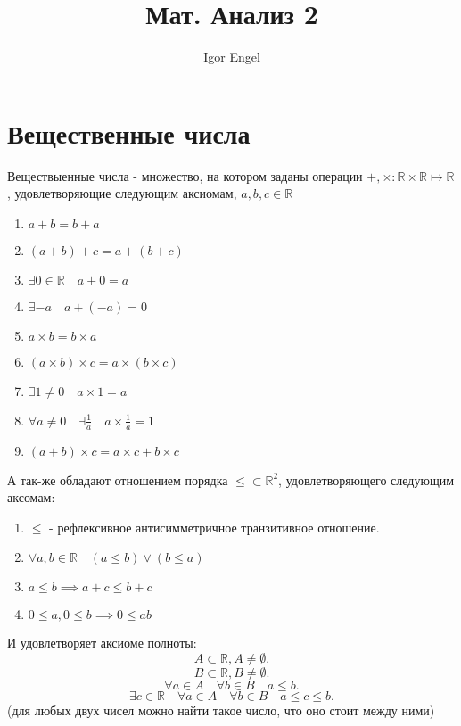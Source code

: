 \documentclass[11pt, oneside]{article}   	%
\title{Мат. Анализ 2}
\author{Igor Engel}
\date{}
\begin{document}
\maketitle
\section{Вещественные числа}
\begin{definition}
    Веществыенные числа - множество, на котором заданы операции $+, \times : \mathbb{R} \times \mathbb{R} \mapsto \mathbb{R}$, удовлетворяющие следующим аксиомам, $a, b, c \in \mathbb{R}$
    \begin{enumerate}
        \item $ a+b=b+a$
        \item $ \left( a+b \right) +c = a+\left( b+c \right)$
        \item $ \exists 0 \in \mathbb{R}\quad a + 0 = a$
        \item $\exists -a\quad a+(-a)=0$
        \item $ a\times b = b\times a$
        \item $ \left( a\times b \right) \times c = a \times \left( b \times c \right)$
        \item $ \exists 1\neq 0\quad a\times 1 = a$
        \item $ \forall{a \neq 0}\quad\exists \frac{1}{a}\quad a\times \frac{1}{a} = 1$
        \item $(a+b)\times c = a\times c+b\times c$
    \end{enumerate}
    А так-же обладают отношением порядка $\le \subset \mathbb{R}^2$, удовлетворяющего следующим аксомам:
    \begin{enumerate}
        \item $\le$ - рефлексивное антисимметричное транзитивное отношение.
        \item $\forall{a, b \in \mathbb{R}}\quad (a\le b)\lor (b\le a)$
        \item $a\le b \implies a + c \le b + c$
        \item $0 \le a, 0 \le b \implies 0 \le ab$
    \end{enumerate}
    И удовлетворяет аксиоме полноты:
    \[ A \subset \mathbb{R}, A \neq \emptyset .\]
    \[ B \subset \mathbb{R}, B \neq \emptyset .\] 
    \[ \forall{a \in A}\quad \forall{b \in B}\quad a \le b .\]
    \[ \exists{c \in \mathbb{R}}\quad \forall{a \in A}\quad \forall{b \in B}\quad a \le c \le b .\]
    (для любых двух чисел можно найти такое число, что оно стоит между ними)
\end{definition}
\end{document}

